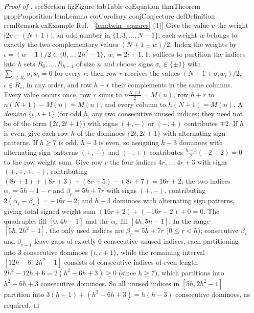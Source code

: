 \documentclass[11pt,a4paper]{article}
\makeatletter
\def\Cref@getprefix#1:#2\relax{#1}
\def\Cref@prefix@sec{sec}
\def\Cref@prefix@fig{fig}
\def\Cref@prefix@tab{tab}
\def\Cref@prefix@eq{eq}
\def\Cref@prefix@thm{thm}
\def\Cref@prefix@prop{prop}
\def\Cref@prefix@lem{lem}
\def\Cref@prefix@cor{cor}
\def\Cref@prefix@conj{conj}
\def\Cref@prefix@def{def}
\def\Cref@prefix@rem{rem}
\def\Cref@prefix@ex{ex}
\def\Cref@type@cap#1{%
  \edef\Cref@tmp{#1}%
  \ifx\Cref@tmp\Cref@prefix@sec Section%
  \else\ifx\Cref@tmp\Cref@prefix@fig Figure%
  \else\ifx\Cref@tmp\Cref@prefix@tab Table%
  \else\ifx\Cref@tmp\Cref@prefix@eq Equation%
  \else\ifx\Cref@tmp\Cref@prefix@thm Theorem%
  \else\ifx\Cref@tmp\Cref@prefix@prop Proposition%
  \else\ifx\Cref@tmp\Cref@prefix@lem Lemma%
  \else\ifx\Cref@tmp\Cref@prefix@cor Corollary%
  \else\ifx\Cref@tmp\Cref@prefix@conj Conjecture%
  \else\ifx\Cref@tmp\Cref@prefix@def Definition%
  \else\ifx\Cref@tmp\Cref@prefix@rem Remark%
  \else\ifx\Cref@tmp\Cref@prefix@ex Example%
  \else Ref.%
  \fi\fi\fi\fi\fi\fi\fi\fi\fi\fi\fi\fi
}
\DeclareRobustCommand{\Cref}[1]{%
  \begingroup
  \edef\Cref@label{#1}%
  \edef\Cref@prefix{\expandafter\Cref@getprefix\Cref@label:\relax}%
  \hyperref[#1]{\Cref@type@cap{\Cref@prefix}~\ref*{#1}}%
  \endgroup
}
\theoremstyle{plain}
\theoremstyle{definition}
\theoremstyle{remark}
\makeatother
\begin{document}
\begin{proof}[Proof of \Cref{lem:twin_squares}(1)]
Give the value $v$ the weight $|2v-(N+1)|$, an odd number in $\{1,3,\dots,N-1\}$; each weight $w$ belongs to exactly the two complementary values $(N+1\pm w)/2$.
Index the weights by $\iota=(w-1)/2\in\{0,\dots,2h^2-1\}$, $w_\iota=2\iota+1$.
It suffices to partition the indices into $h$ sets $R_0,\dots,R_{h-1}$ of size $n$ and choose signs $\sigma_\iota\in\{\pm1\}$ with $\sum_{\iota\in R_r}\sigma_\iota w_\iota=0$ for every $r$: then row $r$ receives the values $(N+1+\sigma_\iota w_\iota)/2$, $\iota\in R_r$, in any order, and row $h+r$ their complements in the same columns.
Every value occurs once, row $r$ sums to $n\frac{N+1}2=M(n)$, row $h+r$ to $n(N+1)-M(n)=M(n)$, and every column to $h(N+1)=M(n)$.
A \emph{domino} $\{\iota,\iota+1\}$ (for odd $h$, any two consecutive unused indices; they need not be of the form $\{2t,2t+1\}$) with signs $(+,-)$ or $(-,+)$ contributes $\mp2$.
If $h$ is even, give each row $h$ of the dominoes $\{2t,2t+1\}$ with alternating sign patterns.
If $h\ge7$ is odd, $h-3$ is even, so assigning $h-3$ dominoes with alternating sign patterns $(+,-)$ and $(-,+)$ contributes $\frac{h-3}{2}(-2+2)=0$ to the row weight sum.
Give row $r$ the four indices $4r,\dots,4r+3$ with signs $(+,+,+,-)$, contributing $(8r+1)+(8r+3)+(8r+5)-(8r+7)=16r+2$; the two indices $\alpha_r=5h-1-r$ and $\beta_r=5h+7r$ with signs $(+,-)$, contributing $2(\alpha_r-\beta_r)=-16r-2$; and $h-3$ dominoes with alternating sign patterns, giving total signed weight sum $(16r+2)+(-16r-2)+0=0$.
The quadruples fill $[0,4h-1]$ and the $\alpha_r$ fill $[4h,5h-1]$.
In the range $[5h, 2h^2-1]$, the only used indices are $\beta_r = 5h+7r$ ($0\le r < h$); consecutive $\beta_r$ and $\beta_{r+1}$ leave gaps of exactly $6$ consecutive unused indices, each partitioning into $3$ consecutive dominoes $\{\iota,\iota+1\}$, while the remaining interval $[12h-6,\,2h^2-1]$ consists of consecutive indices of even length $2h^2-12h+6 = 2(h^2-6h+3) \ge 0$ (since $h\ge7$), which partitions into $h^2-6h+3$ consecutive dominoes.
So all unused indices in $[5h, 2h^2-1]$ partition into $3(h-1)+(h^2-6h+3)=h(h-3)$ consecutive dominoes, as required.
\end{proof}
\end{document}
